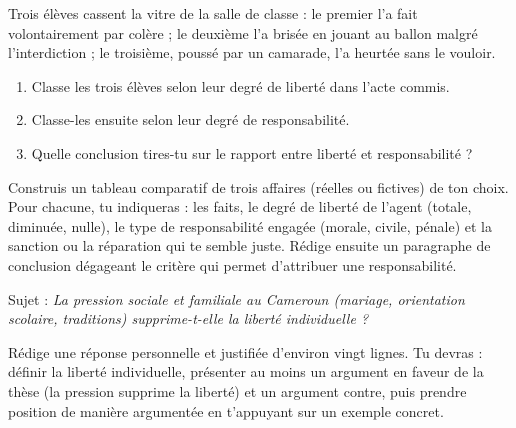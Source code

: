 \documentclass[11pt]{article}
\newcounter{popsec}
\newcounter{popsub}
\newcommand{\courssub}[1]{%
  \stepcounter{popsub}%
  \par\vspace{9pt}\noindent{\popxbold\fontsize{11.5}{13}\selectfont\color{popink}{\color{poporange}\thepopsec.\thepopsub}\hspace{6pt}#1}\par\nopagebreak\vspace{4pt}
}
\begin{document}
\begin{exercice}
Trois élèves cassent la vitre de la salle de classe : le premier l'a fait volontairement par colère ; le deuxième l'a brisée en jouant au ballon malgré l'interdiction ; le troisième, poussé par un camarade, l'a heurtée sans le vouloir.
\begin{enumerate}
\item Classe les trois élèves selon leur degré de liberté dans l'acte commis.
\item Classe-les ensuite selon leur degré de responsabilité.
\item Quelle conclusion tires-tu sur le rapport entre liberté et responsabilité ?
\end{enumerate}
\end{exercice}

\begin{exercice}
Construis un tableau comparatif de trois affaires (réelles ou fictives) de ton choix. Pour chacune, tu indiqueras : les faits, le degré de liberté de l'agent (totale, diminuée, nulle), le type de responsabilité engagée (morale, civile, pénale) et la sanction ou la réparation qui te semble juste. Rédige ensuite un paragraphe de conclusion dégageant le critère qui permet d'attribuer une responsabilité.
\end{exercice}

\begin{exercice}
Sujet : \emph{La pression sociale et familiale au Cameroun (mariage, orientation scolaire, traditions) supprime-t-elle la liberté individuelle ?}

Rédige une réponse personnelle et justifiée d'environ vingt lignes. Tu devras : définir la liberté individuelle, présenter au moins un argument en faveur de la thèse (la pression supprime la liberté) et un argument contre, puis prendre position de manière argumentée en t'appuyant sur un exemple concret.
\end{exercice}

\courssub{Je me prépare au Bac}
\end{document}
